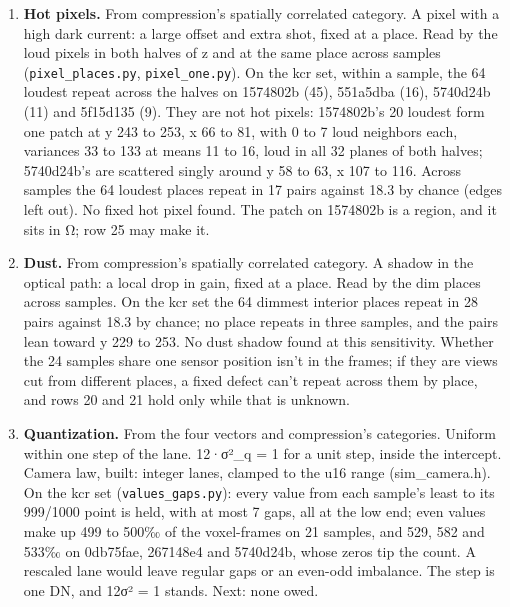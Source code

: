 \begin{enumerate}
\begin{itemize}
\item Prior art, cited from knowledge. DSNU and PRNU as the spatial variance of the dark and of the gain, read from frame averages at several levels: EMVA Standard 1288, “Standard for Characterization of Image Sensors and Cameras”, European Machine Vision Association (rows 18 and 19).
\end{itemize}
\item \textbf{Hot pixels.} From compression's spatially correlated category. A pixel with a high dark current: a large offset and extra shot, fixed at a place. Read by the loud pixels in both halves of z and at the same place across samples (\texttt{pixel\_\allowbreak{}places.\allowbreak{}py}, \texttt{pixel\_\allowbreak{}one.\allowbreak{}py}). On the kcr set, within a sample, the 64 loudest repeat across the halves on 1574802b (45), 551a5dba (16), 5740d24b (11) and 5f15d135 (9). They are not hot pixels: 1574802b's 20 loudest form one patch at y 243 to 253, x 66 to 81, with 0 to 7 loud neighbors each, variances 33 to 133 at means 11 to 16, loud in all 32 planes of both halves; 5740d24b's are scattered singly around y 58 to 63, x 107 to 116. Across samples the 64 loudest places repeat in 17 pairs against 18.3 by chance (edges left out). No fixed hot pixel found. The patch on 1574802b is a region, and it sits in Ω; row 25 may make it.
\item \textbf{Dust.} From compression's spatially correlated category. A shadow in the optical path: a local drop in gain, fixed at a place. Read by the dim places across samples. On the kcr set the 64 dimmest interior places repeat in 28 pairs against 18.3 by chance; no place repeats in three samples, and the pairs lean toward y 229 to 253. No dust shadow found at this sensitivity. Whether the 24 samples share one sensor position isn't in the frames; if they are views cut from different places, a fixed defect can't repeat across them by place, and rows 20 and 21 hold only while that is unknown.
\item \textbf{Quantization.} From the four vectors and compression's categories. Uniform within one step of the lane. 12·σ²\_\allowbreak{}q = 1 for a unit step, inside the intercept. Camera law, built: integer lanes, clamped to the u16 range (sim\_\allowbreak{}camera.h). On the kcr set (\texttt{values\_\allowbreak{}gaps.\allowbreak{}py}): every value from each sample's least to its 999/1000 point is held, with at most 7 gaps, all at the low end; even values make up 499 to 500‰ of the voxel-frames on 21 samples, and 529, 582 and 533‰ on 0db75fae, 267148e4 and 5740d24b, whose zeros tip the count. A rescaled lane would leave regular gaps or an even-odd imbalance. The step is one DN, and 12σ² = 1 stands. Next: none owed.

\end{enumerate}

